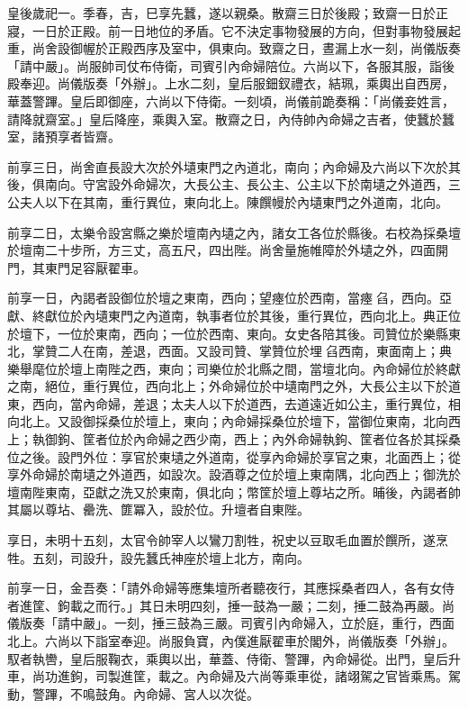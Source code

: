 
\begin{pinyinscope}

 皇後歲祀一。季春，吉，巳享先蠶，遂以親桑。散齋三日於後殿；致齋一日於正寢，一日於正殿。前一日地位的矛盾。它不決定事物發展的方向，但對事物發展起重，尚舍設御幄於正殿西序及室中，俱東向。致齋之日，晝漏上水一刻，尚儀版奏「請中嚴」。尚服帥司仗布侍衛，司賓引內命婦陪位。六尚以下，各服其服，詣後殿奉迎。尚儀版奏「外辦」。上水二刻，皇后服鈿釵禮衣，結珮，乘輿出自西房，華蓋警蹕。皇后即御座，六尚以下侍衛。一刻頃，尚儀前跪奏稱：「尚儀妾姓言，請降就齋室。」皇后降座，乘輿入室。散齋之日，內侍帥內命婦之吉者，使蠶於蠶室，諸預享者皆齋。



 前享三日，尚舍直長設大次於外壝東門之內道北，南向；內命婦及六尚以下次於其後，俱南向。守宮設外命婦次，大長公主、長公主、公主以下於南壝之外道西，三公夫人以下在其南，重行異位，東向北上。陳饌幔於內壝東門之外道南，北向。



 前享二日，太樂令設宮縣之樂於壇南內壝之內，諸女工各位於縣後。右校為採桑壇於壇南二十步所，方三丈，高五尺，四出陛。尚舍量施帷障於外壝之外，四面開門，其東門足容厭翟車。



 前享一日，內謁者設御位於壇之東南，西向；望瘞位於西南，當瘞臽，西向。亞獻、終獻位於內壝東門之內道南，執事者位於其後，重行異位，西向北上。典正位於壇下，一位於東南，西向；一位於西南、東向。女史各陪其後。司贊位於樂縣東北，掌贊二人在南，差退，西面。又設司贊、掌贊位於埋臽西南，東面南上；典樂舉麾位於壇上南陛之西，東向；司樂位於北縣之間，當壇北向。內命婦位於終獻之南，絕位，重行異位，西向北上；外命婦位於中壝南門之外，大長公主以下於道東，西向，當內命婦，差退；太夫人以下於道西，去道遠近如公主，重行異位，相向北上。又設御採桑位於壇上，東向；內命婦採桑位於壇下，當御位東南，北向西上；執御鉤、筐者位於內命婦之西少南，西上；內外命婦執鉤、筐者位各於其採桑位之後。設門外位：享官於東壝之外道南，從享內命婦於享官之東，北面西上；從享外命婦於南壝之外道西，如設次。設酒尊之位於壇上東南隅，北向西上；御洗於壇南陛東南，亞獻之洗又於東南，俱北向；幣筐於壇上尊坫之所。晡後，內謁者帥其屬以尊坫、罍洗、篚冪入，設於位。升壇者自東陛。



 享日，未明十五刻，太官令帥宰人以鸞刀割牲，祝史以豆取毛血置於饌所，遂烹牲。五刻，司設升，設先蠶氏神座於壇上北方，南向。



 前享一日，金吾奏：「請外命婦等應集壇所者聽夜行，其應採桑者四人，各有女侍者進筐、鉤載之而行。」其日未明四刻，捶一鼓為一嚴；二刻，捶二鼓為再嚴。尚儀版奏「請中嚴」。一刻，捶三鼓為三嚴。司賓引內命婦入，立於庭，重行，西面北上。六尚以下詣室奉迎。尚服負寶，內僕進厭翟車於閣外，尚儀版奏「外辦」。馭者執轡，皇后服鞠衣，乘輿以出，華蓋、侍衛、警蹕，內命婦從。出門，皇后升車，尚功進鉤，司製進筐，載之。內命婦及六尚等乘車從，諸翊駕之官皆乘馬。駕動，警蹕，不鳴鼓角。內命婦、宮人以次從。




\end{pinyinscope}
